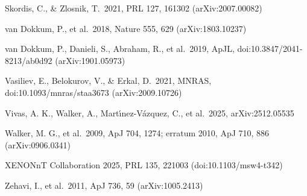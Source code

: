 \documentclass[
  10pt,
]{article}
\begin{document}
{\begin{list}{}{\setlength{\leftmargin}{1.5em}\setlength{\itemindent}{-1.5em}\setlength{\itemsep}{1pt}\setlength{\parsep}{0pt}}
\item Skordis, C., \& Zlosnik, T.\ 2021, PRL 127, 161302 (arXiv:2007.00082)
\item van Dokkum, P., et al.\ 2018, Nature 555, 629 (arXiv:1803.10237)
\item van Dokkum, P., Danieli, S., Abraham, R., et al.\ 2019, ApJL, doi:10.3847/2041-8213/ab0d92 (arXiv:1901.05973)
\item Vasiliev, E., Belokurov, V., \& Erkal, D.\ 2021, MNRAS, doi:10.1093/mnras/staa3673 (arXiv:2009.10726)
\item Vivas, A. K., Walker, A., Mart\'{\i}nez-V\'azquez, C., et al.\ 2025, arXiv:2512.05535
\item Walker, M. G., et al.\ 2009, ApJ 704, 1274; erratum 2010, ApJ 710, 886 (arXiv:0906.0341)
\item XENONnT Collaboration 2025, PRL 135, 221003 (doi:10.1103/msw4-t342)
\item Zehavi, I., et al.\ 2011, ApJ 736, 59 (arXiv:1005.2413)
\end{list}}
\end{document}
